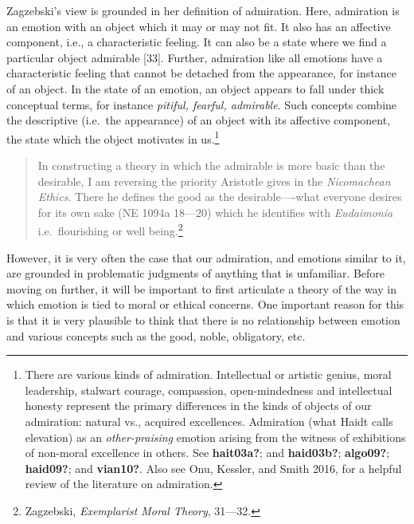 \documentclass[
  12pt,
]{book}
\theoremstyle{definition}
\theoremstyle{definition}
\theoremstyle{definition}
\theoremstyle{definition}
\theoremstyle{remark}
\begin{document}
Zagzebski's view is grounded in her definition of admiration. Here, admiration is an emotion with an object which it may or may not fit. It also has an affective component, i.e., a characteristic feeling. It can also be a state where we find a particular object admirable {[}33{]}. Further, admiration like all emotions have a characteristic feeling that cannot be detached from the appearance, for instance of an object. In the state of an emotion, an object appears to fall under thick conceptual terms, for instance \emph{pitiful, fearful, admirable}. Such concepts combine the descriptive (i.e.~the appearance) of an object with its affective component, the state which the object motivates in us.\footnote{There are various kinds of admiration. Intellectual or artistic genius, moral leadership, stalwart courage, compassion, open-mindedness and intellectual honesty represent the primary differences in the kinds of objects of our admiration: natural vs., acquired excellences. Admiration (what Haidt calls elevation) as an \emph{other-praising} emotion arising from the witness of exhibitions of non-moral excellence in others. See \textbf{hait03a?}; and \textbf{haid03b?}; \textbf{algo09?}; \textbf{haid09?}; and \textbf{vian10?}. Also see Onu, Kessler, and Smith 2016, for a helpful review of the literature on admiration.}

\begin{quote}
In constructing a theory in which the admirable is more basic than the desirable, I am reversing the priority Aristotle gives in the \emph{Nicomachean Ethics}. There he defines the good as the desirable----what everyone desires for its own sake (NE 1094a 18---20) which he identifies with \emph{Eudaimonia} i.e.~flourishing or well being.\footnote{Zagzebski, \emph{Exemplarist {Moral Theory}}, 31---32.}
\end{quote}

However, it is very often the case that our admiration, and emotions similar to it, are grounded in problematic judgments of anything that is unfamiliar. Before moving on further, it will be important to first articulate a theory of the way in which emotion is tied to moral or ethical concerns. One important reason for this is that it is very plausible to think that there is no relationship between emotion and various concepts such as the good, noble, obligatory, etc.
\end{document}
